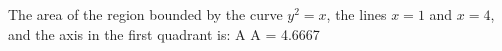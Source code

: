 The area of the region bounded by the curve $y^2 = x$, the lines $x = 1$ and $x = 4$, and the axis in the first quadrant is: A 
A = 4.6667
